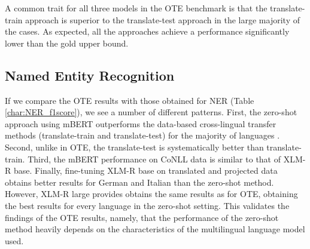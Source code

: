 \documentclass[11pt]{article}
\begin{document}
A common trait for all three models in the OTE benchmark is that the translate-train approach is superior to the translate-test approach in the large majority of the cases. As expected, all the approaches achieve a performance significantly lower than the gold upper bound.

\subsection{Named Entity Recognition}

If we compare the OTE results with those obtained for NER (Table \ref{char:NER_f1score}), we see a number of different patterns. First, the zero-shot approach using mBERT outperforms the data-based cross-lingual transfer methods (translate-train and translate-test) for the majority of languages . Second, unlike in OTE, the translate-test is systematically better than translate-train. Third, the mBERT performance on CoNLL data is similar to that of XLM-R base. Finally, fine-tuning XLM-R base on translated and projected data obtains better results for German and Italian than the zero-shot method. However, XLM-R large provides obtains the same results as for OTE, obtaining the best results for every language in the zero-shot setting. This validates the findings of the OTE results, namely, that the performance of the zero-shot method heavily depends on the characteristics of the multilingual language model used.
\end{document}
